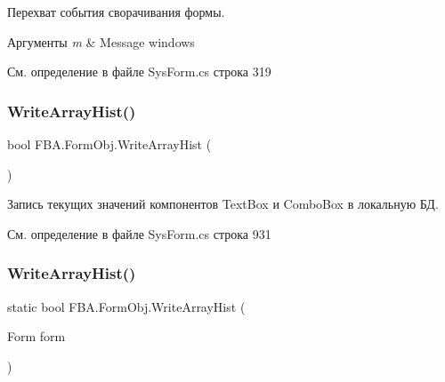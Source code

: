 Перехват события сворачивания формы. 


\begin{DoxyParams}{Аргументы}
{\em m} & Message windows\\
\hline
\end{DoxyParams}


См. определение в файле Sys\+Form.\+cs строка 319

\mbox{\label{class_f_b_a_1_1_form_obj_abf5098c7b5dc3caf85a0922a1da59fd3}} 
\subsubsection{\texorpdfstring{Write\+Array\+Hist()}{WriteArrayHist()}\hspace{0.1cm}{\footnotesize\ttfamily [1/2]}}
{\footnotesize\ttfamily bool F\+B\+A.\+Form\+Obj.\+Write\+Array\+Hist (\begin{DoxyParamCaption}{ }\end{DoxyParamCaption})}



Запись текущих значений компонентов Text\+Box и Combo\+Box в локальную БД. 



См. определение в файле Sys\+Form.\+cs строка 931

\mbox{\label{class_f_b_a_1_1_form_obj_ab2c956c7f0f94bccd3d7e9d78dc1203c}} 
\subsubsection{\texorpdfstring{Write\+Array\+Hist()}{WriteArrayHist()}\hspace{0.1cm}{\footnotesize\ttfamily [2/2]}}
{\footnotesize\ttfamily static bool F\+B\+A.\+Form\+Obj.\+Write\+Array\+Hist (\begin{DoxyParamCaption}\item[{Form}]{form }\end{DoxyParamCaption})\hspace{0.3cm}{\ttfamily [static]}}



